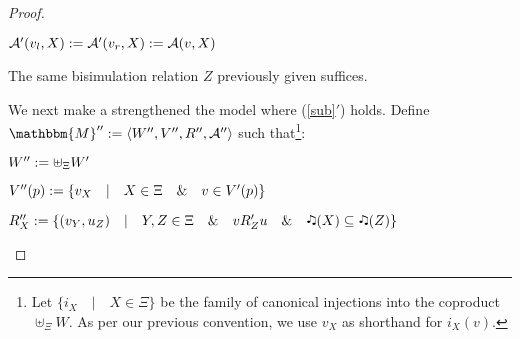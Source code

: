 \begin{proof}
\begin{itemizedot}
    \item $\mathcal{A}' (v_l, X) := \mathcal{A}' (v_r, X) :=
    \mathcal{A} (v, X)$
  \end{itemizedot}
  The same bisimulation relation $Z$ previously given suffices.
  
  
  
  We next make a strengthened the model where (\ref{sub}$'$) holds.  Define
  $\mathbbm{M}'' \assign \langle W'', V'', R'', \mathcal{A}'' \rangle$ such
  that{\footnote{Let $\{i_X \hspace{1em} | \hspace{1em} X \in \Xi\}$ be the
  family of canonical injections into the coproduct $\uplus_{\Xi} W$. As per
  our previous convention, we use $v_X$ as shorthand for $i_X (v)$.}}:
  \begin{itemizedot}
    \item $W'' := \uplus_{\Xi} W'$
    
    \item $V'' (p) := \{v_X \hspace{1em} | \hspace{1em} X \in \Xi
    \hspace{1em} \& \hspace{1em} v \in V' (p)\}$
    
    \item $R''_X \assign \{(v_Y, u_Z) \hspace{1em} | \hspace{1em} Y, Z \in \Xi
    \hspace{1em} \& \hspace{1em} v R'_Z u \hspace{1em} \& \hspace{1em}
    \twonotes (X) \subseteq \twonotes (Z)\}$
    

\end{itemizedot}
\end{proof}
